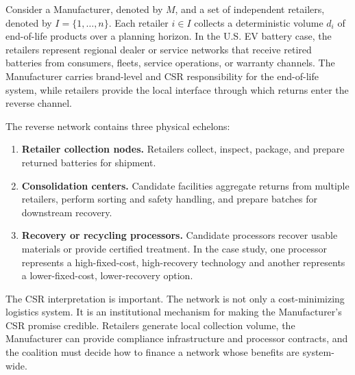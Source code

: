 Consider a Manufacturer, denoted by $M$, and a set of independent retailers, denoted by $I=\{1,\ldots,n\}$. Each retailer $i\in I$ collects a deterministic volume $d_i$ of end-of-life products over a planning horizon. In the U.S. EV battery case, the retailers represent regional dealer or service networks that receive retired batteries from consumers, fleets, service operations, or warranty channels. The Manufacturer carries brand-level and CSR responsibility for the end-of-life system, while retailers provide the local interface through which returns enter the reverse channel.

The reverse network contains three physical echelons:
\begin{enumerate}
    \item \textbf{Retailer collection nodes.} Retailers collect, inspect, package, and prepare returned batteries for shipment.
    \item \textbf{Consolidation centers.} Candidate facilities aggregate returns from multiple retailers, perform sorting and safety handling, and prepare batches for downstream recovery.
    \item \textbf{Recovery or recycling processors.} Candidate processors recover usable materials or provide certified treatment. In the case study, one processor represents a high-fixed-cost, high-recovery technology and another represents a lower-fixed-cost, lower-recovery option.
\end{enumerate}

The CSR interpretation is important. The network is not only a cost-minimizing logistics system. It is an institutional mechanism for making the Manufacturer's CSR promise credible. Retailers generate local collection volume, the Manufacturer can provide compliance infrastructure and processor contracts, and the coalition must decide how to finance a network whose benefits are system-wide.

